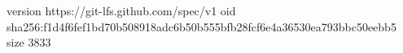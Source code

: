 version https://git-lfs.github.com/spec/v1
oid sha256:f1d4f6fef1bd70b508918adc6b50b555bfb28fcf6e4a36530ea793bbc50eebb5
size 3833

